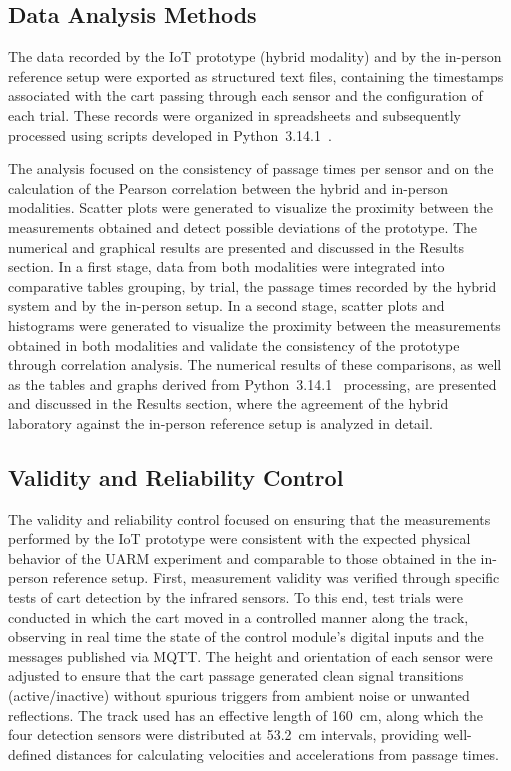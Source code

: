 \documentclass[sensors,article,submit,pdftex]{Definitions/mdpi}
\begin{document}

\subsection{Data Analysis Methods}

The data recorded by the IoT prototype (hybrid modality) and by the in-person reference setup were exported as structured text files, containing the timestamps associated with the cart passing through each sensor and the configuration of each trial. These records were organized in spreadsheets and subsequently processed using scripts developed in Python~3.14.1~\cite{r47}.

The analysis focused on the consistency of passage times per sensor and on the calculation of the Pearson correlation between the hybrid and in-person modalities. Scatter plots were generated to visualize the proximity between the measurements obtained and detect possible deviations of the prototype. The numerical and graphical results are presented and discussed in the Results section. In a first stage, data from both modalities were integrated into comparative tables grouping, by trial, the passage times recorded by the hybrid system and by the in-person setup. In a second stage, scatter plots and histograms were generated to visualize the proximity between the measurements obtained in both modalities and validate the consistency of the prototype through correlation analysis. The numerical results of these comparisons, as well as the tables and graphs derived from Python~3.14.1~\cite{r47} processing, are presented and discussed in the Results section, where the agreement of the hybrid laboratory against the in-person reference setup is analyzed in detail.


\subsection{Validity and Reliability Control}

The validity and reliability control focused on ensuring that the measurements performed by the IoT prototype were consistent with the expected physical behavior of the UARM experiment and comparable to those obtained in the in-person reference setup. First, measurement validity was verified through specific tests of cart detection by the infrared sensors. To this end, test trials were conducted in which the cart moved in a controlled manner along the track, observing in real time the state of the control module's digital inputs and the messages published via MQTT. The height and orientation of each sensor were adjusted to ensure that the cart passage generated clean signal transitions (active/inactive) without spurious triggers from ambient noise or unwanted reflections. The track used has an effective length of 160~cm, along which the four detection sensors were distributed at 53.2~cm intervals, providing well-defined distances for calculating velocities and accelerations from passage times.
\end{document}
